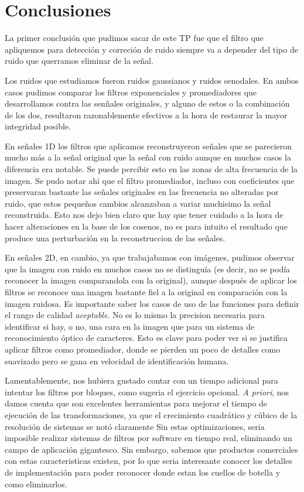 \section{Conclusiones}

La primer conclusi\'on que pudimos sacar de este TP fue que el filtro que apliquemos para detecci\'on y correci\'on
de ruido siempre va a depender del tipo de ruido que querramos eliminar de la se\~nal.

Los ruidos que estudiamos fueron ruidos gaussianos y ruidos senodales. En ambos casos pudimos comparar los filtros
exponenciales y promediadores que desarrollamos contra las sen\~nales originales, y alguno de estos o la combinaci\'on de los dos,
resultaron razonablemente efectivos a la hora de restaurar la mayor integridad posible.

En se\~nales 1D los filtros que aplicamos reconstruyeron se\~nales que se parecieron mucho m\'as a la se\~nal
original que la se\~nal con ruido aunque en muchos casos la diferencia era notable. Se puede percibir esto en las zonas
de alta frecuencia de la imagen. Se pudo notar ahi que el filtro promediador, incluso con coeficientes que preservaran
bastante las se\~nales originales en las frecuencia no alteradas por ruido, que estos peque\~nos cambios alcanzaban a
variar muchisimo la se\~nal reconstruida. Esto nos dejo bien claro que hay que tener cuidado a la hora de hacer alteraciones
en la base de los cosenos, no es para intuito el resultado que produce una perturbaci\'on en la reconstruccion de las se\~nales.

En se\~nales 2D, en cambio, ya que trabajabamos con im\'agenes, pudimos observar que la imagen con ruido en muchos
casos no se distingu\'ia (es decir, no se pod\'ia reconocer la imagen comparandola con la original), aunque despu\'es
de aplicar los filtros se reconoce una imagen bastante fiel a la original en comparaci\'on con la imagen ruidosa.
Es importante saber los casos de uso de las funciones para definir el rango de calidad \textit{aceptable}. No es lo mismo
la precision necesaria para identificar si hay, o no, una cara en la imagen que para un sistema de reconocimiento \'optico
de caracteres. Esto es clave para poder ver si se justifica aplicar filtros como promediador, donde se pierden un poco de detalles como suavizado
pero se gana en velocidad de identificaci\'on humana.

Lamentablemente, nos hubiera gustado contar con un tiempo adicional para intentar los filtros por bloques, como sugeria el ejercicio
opcional. \textit{A priori}, nos damos cuenta que son excelentes herramientas para mejorar el tiempo de ejecuci\'on
de las transformaciones, ya que el crecimiento cuadr\'atico y c\'ubico de la resoluci\'on de sistemas se not\'o claramente
Sin estas optimizaciones, seria imposible realizar sistemas de filtros por software en tiempo real, eliminando un campo de 
aplicaci\'on gigantesco. Sin embargo, sabemos que productos comerciales con estas caracteristicas existen, por lo que
seria interesante conocer los detalles de implementaci\'on para poder reconocer donde estan los cuellos de botella y como
eliminarlos.

